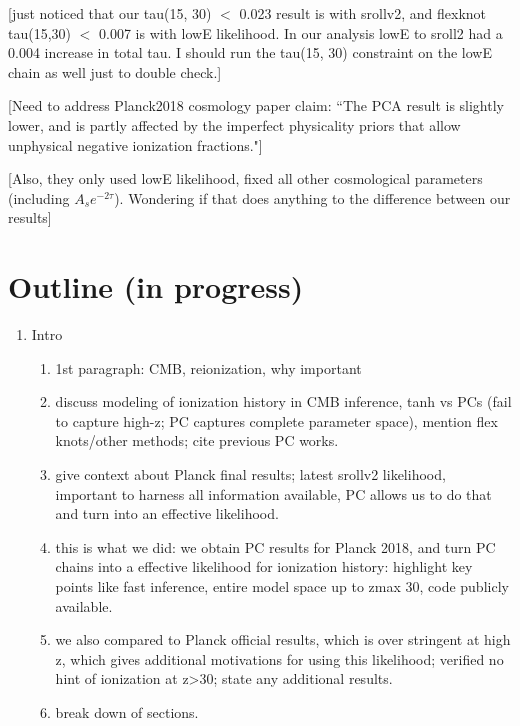 \documentclass[prd,twocolumn,amsmath,amssymb,floatfix,superscriptaddress,nofootinbib]{revtex4-1}
\begin{document}
{[just noticed that our tau(15, 30) $<$ 0.023 result is with srollv2, and flexknot tau(15,30) $<$ 0.007 is with lowE likelihood. In our analysis lowE to sroll2 had a 0.004 increase in total tau. I should run the tau(15, 30) constraint on the lowE chain as well just to double check.]

[Need to address Planck2018 cosmology paper claim: ``The PCA result is slightly lower, and is partly affected by the imperfect physicality priors that allow unphysical negative ionization fractions."]

[Also, they only used lowE likelihood, fixed all other cosmological parameters (including $A_s e^{-2\tau}$). Wondering if that does anything to the difference between our results]



\section{Outline (in progress)}

\begin{enumerate}
    \item{Intro}
        \begin{enumerate}
            \item 1st paragraph: CMB, reionization, why important
            \item discuss modeling of ionization history in CMB inference, tanh vs PCs (fail to capture high-z; PC captures complete parameter space), mention flex knots/other methods; cite previous PC works.
            \item give context about Planck final results; latest srollv2 likelihood, important to harness all information available, PC allows us to do that and turn into an effective likelihood.
            \item this is what we did: we obtain PC results for Planck 2018, and turn PC chains into a effective likelihood for ionization history: highlight key points like fast inference, entire model space up to zmax 30, code publicly available.
            \item we also compared to Planck official results, which is over stringent at high z, which gives additional motivations for using this likelihood; verified no hint of ionization at z>30; state any additional results.
            \item break down of sections.
        \end{enumerate}


\end{enumerate}}
\end{document}
